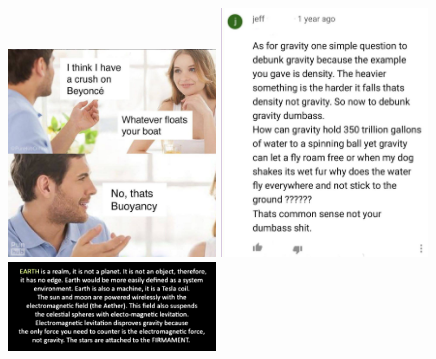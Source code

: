 
\includegraphics[width=5.5cm]{images/gravity_stupid/stupid1}
\includegraphics[width=5.5cm]{images/gravity_stupid/stupid2}
\includegraphics[width=5.5cm]{images/gravity_stupid/stupid3}
